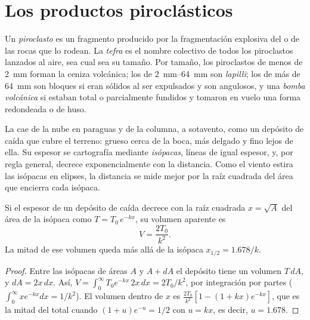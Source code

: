 \section{Los productos piroclásticos}

\begin{definition}\label{def:b2:eruptive-styles:tephra}
Un \emph{piroclasto} es un fragmento producido por la fragmentación
explosiva del  o de las rocas que lo rodean. La \emph{tefra} es
el nombre colectivo de todos los piroclastos lanzados al aire, sea cual sea su tamaño.
Por tamaño, los piroclastos de menos de \qty{2}{mm} forman la ceniza volcánica; los de
\qtyrange{2}{64}{mm} son \emph{lapilli}; los de más de
\qty{64}{mm} son bloques si eran sólidos al ser expulsados y son angulosos, y una
\emph{bomba volcánica} si estaban total o parcialmente fundidos
y tomaron en vuelo una forma redondeada o de huso.
\end{definition}

La  cae de la nube en paraguas y de la columna, a sotavento, como un depósito de caída
que cubre el terreno: grueso cerca de la boca, más delgado y fino lejos de ella. Su
espesor se cartografía mediante \emph{isópacas}, líneas de igual espesor, y, por regla general,
decrece exponencialmente con la distancia. Como el viento estira las isópacas
en elipses, la distancia se mide mejor por la raíz cuadrada del área que encierra cada
isópaca.

\begin{proposition}\label{prop:b2:eruptive-styles:thinning}
Si el espesor de un depósito de caída decrece con la raíz cuadrada $x = \sqrt A$
del área de la isópaca como $T = T_0\,e^{-kx}$, su volumen aparente es
\[
V = \frac{2T_0}{k^2}.
\]
La mitad de ese volumen queda más allá de la isópaca $x_{1/2} = 1.678/k$.
\end{proposition}

\begin{proof}
Entre las isópacas de áreas $A$ y $A + dA$ el depósito tiene un volumen $T\,dA$,
y $dA = 2x\,dx$. Así, $V = \int_0^\infty T_0e^{-kx}\,2x\,dx = 2T_0/k^2$, por
integración por partes ($\int_0^\infty xe^{-kx}dx = 1/k^2$). El volumen dentro de $x$
es $\frac{2T_0}{k^2}[1 - (1 + kx)e^{-kx}]$, que es la mitad del total cuando $(1 +
u)e^{-u} = 1/2$ con $u = kx$, es decir, $u = 1.678$.
\end{proof}

